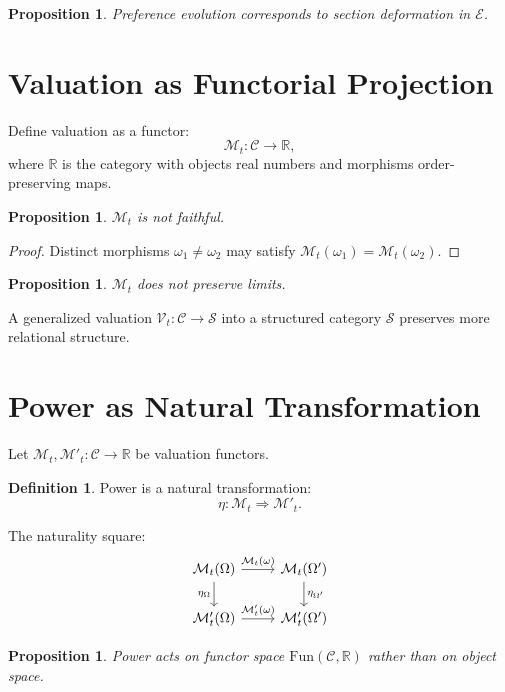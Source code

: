 \documentclass[11pt,a4paper]{article}
\newtheorem{proposition}[theorem]{Proposition}
\theoremstyle{definition}
\newtheorem{definition}[theorem]{Definition}
\theoremstyle{remark}
\begin{document}
\begin{proposition}
Preference evolution corresponds to section deformation in $\mathcal{E}$.
\end{proposition}

\section{Valuation as Functorial Projection}

Define valuation as a functor:
\[
\mathcal{M}_t : \mathcal{C} \to \mathbb{R},
\]
where $\mathbb{R}$ is the category with objects real numbers and morphisms order-preserving maps.

\begin{proposition}
$\mathcal{M}_t$ is not faithful.
\end{proposition}

\begin{proof}
Distinct morphisms $\omega_1 \neq \omega_2$ may satisfy $\mathcal{M}_t(\omega_1) = \mathcal{M}_t(\omega_2)$.
\end{proof}

\begin{proposition}
$\mathcal{M}_t$ does not preserve limits.
\end{proposition}

A generalized valuation $\mathcal{V}_t : \mathcal{C} \to \mathcal{S}$ into a structured category $\mathcal{S}$ preserves more relational structure.

\section{Power as Natural Transformation}

Let $\mathcal{M}_t, \mathcal{M}'_t : \mathcal{C} \to \mathbb{R}$ be valuation functors.

\begin{definition}
Power is a natural transformation:
\[
\eta : \mathcal{M}_t \Rightarrow \mathcal{M}'_t.
\]
\end{definition}

The naturality square:
\[
\begin{tikzcd}
\mathcal{M}_t(\Omega) \arrow[r, "\mathcal{M}_t(\omega)"] \arrow[d, "\eta_\Omega"'] & \mathcal{M}_t(\Omega') \arrow[d, "\eta_{\Omega'}"] \\
\mathcal{M}'_t(\Omega) \arrow[r, "\mathcal{M}'_t(\omega)"] & \mathcal{M}'_t(\Omega')
\end{tikzcd}
\]

\begin{proposition}
Power acts on functor space $\mathrm{Fun}(\mathcal{C}, \mathbb{R})$ rather than on object space.
\end{proposition}
\end{document}
